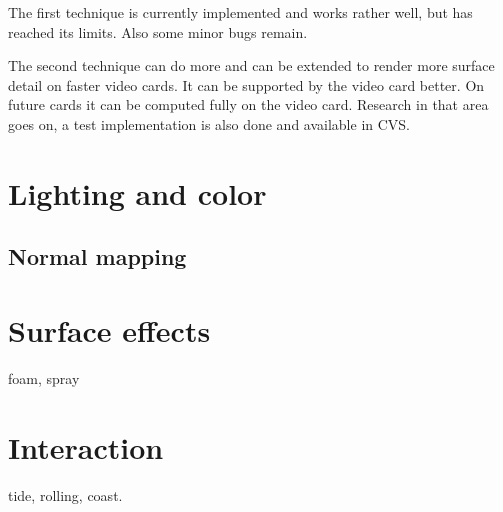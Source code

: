\documentclass[english,a4paper,12pt]{report}
\begin{document}
The first technique is currently implemented and works rather well, but
has reached its limits. Also some minor bugs remain.

The second technique can do more and can be extended to render more
surface detail on faster video cards. It can be supported by the video
card better. On future cards it can be computed fully on the video card.
Research in that area goes on, a test implementation is also done and
available in CVS.

\section{Lighting and color}

\subsection{Normal mapping}

\section{Surface effects}

foam, spray

\section{Interaction}

tide, rolling, coast.
\end{document}
